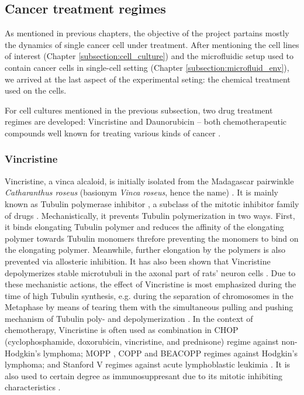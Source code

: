 \documentclass[pdftex,12pt,a4paper]{report}
\begin{document}
\subsection{Cancer treatment regimes}
\label{subsection:treatment}

As mentioned in previous chapters, the objective of the project partains mostly the dynamics of single cancer cell under treatment. After mentioning the cell lines of interest (Chapter \ref{subsection:cell_culture}) and the microfluidic setup used to contain cancer cells in single-cell setting (Chapter \ref{subsection:microfluid_env}), we arrived at the last aspect of the experimental seting: the chemical treatment used on the cells.

For cell cultures mentioned in the previous subsection, two drug treatment regimes are developed: Vincristine and Daunorubicin -- both chemotherapeutic compounds well known for treating various kinds of cancer \cite{drugs2018defdaunorubicin, ravina2011evolution, tsuruo1981overcoming, gewirtz1999critical}.

\subsubsection*{Vincristine}

Vincristine, a vinca alcaloid, is initially isolated from the Madagascar pairwinkle \textit{Catharanthus roseus} (basionym \textit{Vinca roseus}, hence the name) \cite{nci2018defvincristine}. It is mainly known as Tubulin polymerase inhibitor \cite{tsuruo1982increased}, a subclass of the mitotic inhibitor family of drugs \cite{jordan1998tubulin}. Mechanistically, it prevents Tubulin polymerization in two ways. First, it binds elongating Tubulin polymer and reduces the affinity of the elongating polymer \cite{lobert1996interaction} towards Tubulin monomers threfore preventing the monomers to bind on the elongating polymer. Meanwhile, further elongation by the polymers is also prevented via allosteric inhibition. It has also been shown that Vincristine depolymerizes stable microtubuli in the axonal part of rats' neuron cells \cite{jordan1998tubulin}. Due to these mechanistic actions, the effect of Vincristine is most emphasized during the time of high Tubulin synthesis, e.g. during the separation of chromosomes in the Metaphase by means of tearing them with the simultaneous pulling and pushing mechanism of Tubulin poly- and depolymerization \cite{owellen1972binding}. In the context of chemotherapy, Vincristine is often used as combination in CHOP (cyclophosphamide, doxorubicin, vincristine, and prednisone) regime \cite{hiddemann2005frontline} against non-Hodgkin's lymphoma; MOPP \cite{brandriff1994chromosomal}, COPP \cite{pfreundschuh1987lomustine} and BEACOPP \cite{diehl1998beacopp} regimes against Hodgkin's lymphoma; and Stanford V regimes against acute lymphoblastic leukimia \cite{bartlett1995brief}. It is also used to certain degree as immunosuppresant due to its mitotic inhibiting characteristics \cite{ahn1974vincristine}.
\end{document}
